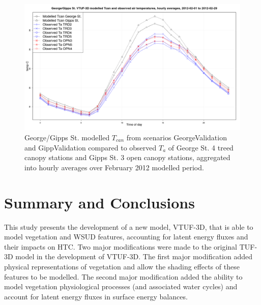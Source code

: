 \documentclass[final,3p,times,authoryear]{elsarticle}
\begin{document}
\begin{figure}[!htbp]
\includegraphics[trim = 0mm 0mm 0mm 0mm, clip, scale=0.30]{images/GeorgeValidationTcanAgg.png}
\caption{George/Gipps St. modelled $T_{can}$ from scenarios GeorgeValidation and GippValidation compared to observed $T_{a}$ of George St. 4 treed canopy stations and Gipps St. 3 open canopy stations, aggregated into hourly averages over February 2012 modelled period.\label{fig:GeorgeGippsStTcanCompare}} 
\end{figure}


\section{Summary and Conclusions}

This study presents the development of a new model, VTUF-3D, that is able to model vegetation and WSUD features, accounting for latent energy fluxes and their impacts on HTC. Two major modifications were made to the original TUF-3D model in the development of VTUF-3D. The first major modification added physical representations of vegetation and allow the shading effects of these features to be modelled. The second major modification added the ability to model vegetation physiological processes (and associated water cycles) and account for latent energy fluxes in surface energy balances.
\end{document}
